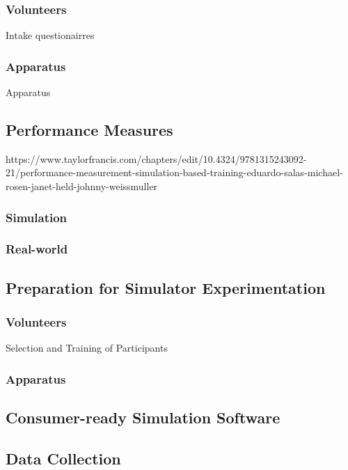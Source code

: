 \documentclass[12pt]{article}
\begin{document}
\subsubsection{Volunteers}

Intake questionairres 

\subsubsection{Apparatus}

Apparatus

\subsection{Performance Measures}

https://www.taylorfrancis.com/chapters/edit/10.4324/9781315243092-21/performance-measurement-simulation-based-training-eduardo-salas-michael-rosen-janet-held-johnny-weissmuller

\subsubsection{Simulation}

\subsubsection{Real-world}

\subsection{Preparation for Simulator Experimentation}

\subsubsection{Volunteers}

Selection and Training of Participants

\subsubsection{Apparatus}

\subsection{Consumer-ready Simulation Software}

\subsection{Data Collection}
\end{document}
